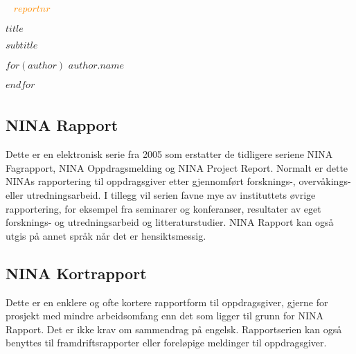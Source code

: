 \documentclass[11pt, a4paper]{article}
\newcommand{\shadOrange}[1]{\textcolor{lightOrange}{#1}}
\newcommand{\orange}[1]{\textcolor{darkOrange}{#1}}
\newcommand{\darkGrey}[1]{\textcolor{darkgrey}{#1}}
\begin{document}
\begin{titlepage}

\thispagestyle{titlefooter}
\begin{center}
\vspace{-1cm}
\Large\shadOrange{}
\end{center}
\vspace{2cm}

\Huge{\darkGrey{~}} \hspace{.7cm} \textbf{\orange{$reportnr$}}
\vspace{2cm}

\Huge{$title$} \par\vspace{.5cm}
\huge{$subtitle$} \par\vspace{1cm}

$for(author)$
\LARGE{$author.name$} \par
$endfor$

\restoregeometry
\end{titlepage}
\cfoot{}

\section*{}


\subsection*{\small{NINA Rapport}}
{\small Dette er en elektronisk serie fra 2005 som erstatter de tidligere seriene NINA Fagrapport, NINA Oppdragsmelding og NINA Project Report. Normalt er dette NINAs rapportering til oppdragsgiver etter gjennomført forsknings\hyp{}, overvåkings\hyp{} eller utredningsarbeid. I tillegg vil serien favne mye av instituttets øvrige rapportering, for eksempel fra seminarer og konferanser, resultater av eget forsknings\hyp{} og utredningsarbeid og litteraturstudier. NINA Rapport kan også utgis på annet språk når det er hensiktsmessig.}

\subsection*{\small{NINA Kortrapport}}
{\small Dette er en enklere og ofte kortere rapportform til oppdragsgiver, gjerne for prosjekt med mindre arbeidsomfang enn det som ligger til grunn for NINA Rapport. Det er ikke krav om sammendrag på engelsk. Rapportserien kan også benyttes til framdriftsrapporter eller foreløpige meldinger til oppdragsgiver.}
\end{document}
